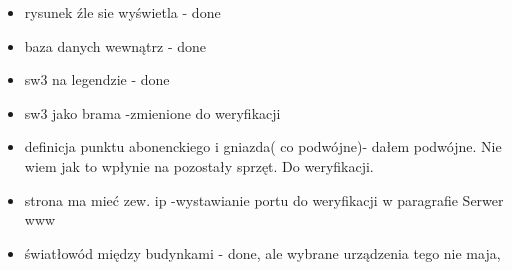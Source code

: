 \documentclass{report}
\begin{document}
 \begin{itemize}
\item rysunek źle sie wyświetla - done
\item baza danych wewnątrz - done
\item sw3 na legendzie - done
\item sw3 jako brama -zmienione do weryfikacji
\item definicja punktu abonenckiego i gniazda( co podwójne)- dałem podwójne. Nie wiem jak to wpłynie na pozostały sprzęt. Do weryfikacji.
\item strona ma mieć zew. ip -wystawianie portu do weryfikacji w paragrafie Serwer www
\item światłowód między budynkami - done, ale wybrane urządzenia tego nie maja,

 \end{itemize}
\end{document}
